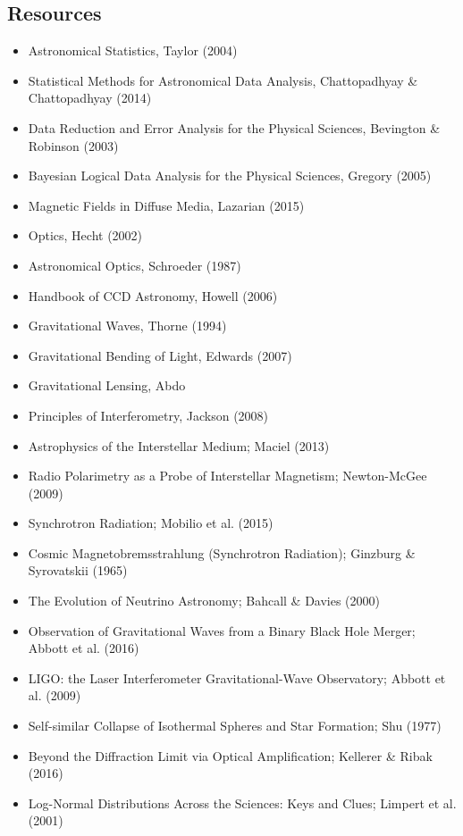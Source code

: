 \documentclass[a4paper,10pt]{article}
\begin{document}
\newpage
\subsection{Resources}

\begin{itemize}
    \item Astronomical Statistics, Taylor (2004)
    \item Statistical Methods for Astronomical Data Analysis, Chattopadhyay \& Chattopadhyay (2014)
    \item Data Reduction and Error Analysis for the Physical Sciences, Bevington \& Robinson (2003)
    \item Bayesian Logical Data Analysis for the Physical Sciences, Gregory (2005)
    \item Magnetic Fields in Diffuse Media, Lazarian (2015)
    \item Optics, Hecht (2002)
    \item Astronomical Optics, Schroeder (1987)
    \item Handbook of CCD Astronomy, Howell (2006)
    \item Gravitational Waves, Thorne (1994)
    \item Gravitational Bending of Light, Edwards (2007)
    \item Gravitational Lensing, Abdo
    \item Principles of Interferometry, Jackson (2008)
    \item Astrophysics of the Interstellar Medium; Maciel (2013)
    \item Radio Polarimetry as a Probe of Interstellar Magnetism; Newton-McGee (2009)
    \item Synchrotron Radiation; Mobilio et al. (2015)
    \item Cosmic Magnetobremsstrahlung (Synchrotron Radiation); Ginzburg \& Syrovatskii (1965)
    \item The Evolution of Neutrino Astronomy; Bahcall \& Davies (2000)
    \item Observation of Gravitational Waves from a Binary Black Hole Merger; Abbott et al. (2016)
    \item LIGO: the Laser Interferometer Gravitational-Wave Observatory; Abbott et al. (2009)
    \item Self-similar Collapse of Isothermal Spheres and Star Formation; Shu (1977)
    \item Beyond the Diffraction Limit via Optical Amplification; Kellerer \& Ribak (2016)
    \item Log-Normal Distributions Across the Sciences: Keys and Clues; Limpert et al. (2001)
\end{itemize}
\end{document}
